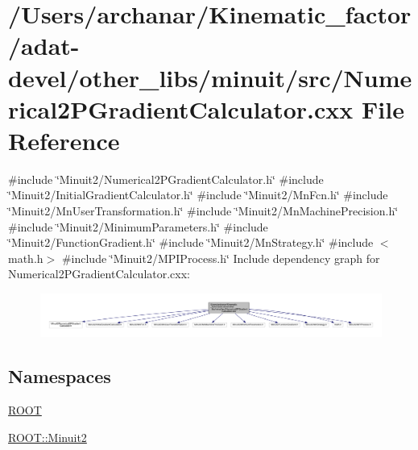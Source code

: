 \hypertarget{adat-devel_2other__libs_2minuit_2src_2Numerical2PGradientCalculator_8cxx}{}\section{/\+Users/archanar/\+Kinematic\+\_\+factor/adat-\/devel/other\+\_\+libs/minuit/src/\+Numerical2\+P\+Gradient\+Calculator.cxx File Reference}
\label{adat-devel_2other__libs_2minuit_2src_2Numerical2PGradientCalculator_8cxx}
{\ttfamily \#include \char`\"{}Minuit2/\+Numerical2\+P\+Gradient\+Calculator.\+h\char`\"{}}\newline
{\ttfamily \#include \char`\"{}Minuit2/\+Initial\+Gradient\+Calculator.\+h\char`\"{}}\newline
{\ttfamily \#include \char`\"{}Minuit2/\+Mn\+Fcn.\+h\char`\"{}}\newline
{\ttfamily \#include \char`\"{}Minuit2/\+Mn\+User\+Transformation.\+h\char`\"{}}\newline
{\ttfamily \#include \char`\"{}Minuit2/\+Mn\+Machine\+Precision.\+h\char`\"{}}\newline
{\ttfamily \#include \char`\"{}Minuit2/\+Minimum\+Parameters.\+h\char`\"{}}\newline
{\ttfamily \#include \char`\"{}Minuit2/\+Function\+Gradient.\+h\char`\"{}}\newline
{\ttfamily \#include \char`\"{}Minuit2/\+Mn\+Strategy.\+h\char`\"{}}\newline
{\ttfamily \#include $<$math.\+h$>$}\newline
{\ttfamily \#include \char`\"{}Minuit2/\+M\+P\+I\+Process.\+h\char`\"{}}\newline
Include dependency graph for Numerical2\+P\+Gradient\+Calculator.\+cxx\+:
\nopagebreak
\begin{figure}[H]
\begin{center}
\leavevmode
\includegraphics[width=350pt]{d6/d05/adat-devel_2other__libs_2minuit_2src_2Numerical2PGradientCalculator_8cxx__incl}
\end{center}
\end{figure}
\subsection*{Namespaces}
\begin{DoxyCompactItemize}
\item 
 \mbox{\hyperlink{namespaceROOT}{R\+O\+OT}}
\item 
 \mbox{\hyperlink{namespaceROOT_1_1Minuit2}{R\+O\+O\+T\+::\+Minuit2}}
\end{DoxyCompactItemize}
